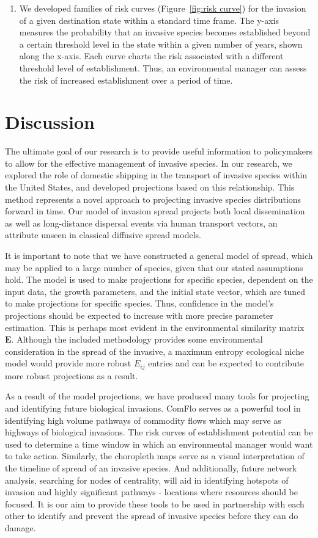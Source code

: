 \documentclass[12pt]{article}
\begin{document}
\begin{enumerate}
\item We developed families of risk curves (Figure~\ref{fig:risk curve}) for the invasion of a given destination state within a standard time frame. The y-axis measures the probability that an invasive species becomes established beyond a certain threshold level in the state within a given number of years, shown along the x-axis. Each curve charts the risk associated with a different threshold level of establishment.  Thus, an environmental manager can assess the risk of increased establishment over a period of time.

\end{enumerate}


\section*{Discussion}

The ultimate goal of our research is to provide useful information to policymakers to allow for the effective management of invasive species. In our research, we explored the role of domestic shipping in the transport of invasive species within the United States, and developed projections based on this relationship. This method represents a novel approach to projecting invasive species distributions forward in time. Our model of invasion spread projects both local dissemination as well as long-distance dispersal events via human transport vectors, an attribute unseen in classical diffusive spread models.

It is important to note that we have constructed a general model of spread, which may be applied to a large number of species, given that our stated assumptions hold. The model is used to make projections for specific species, dependent on the input data, the growth parameters, and the initial state vector, which are tuned to make projections for specific species.  Thus, confidence in the model's projections should be expected to increase with more precise parameter estimation.  This is perhaps most evident in the environmental similarity matrix $\mathbf{E}$. Although the included methodology provides some environmental consideration in the spread of the invasive, a maximum entropy ecological niche model would provide more robust $E_{ij}$ entries and can be expected to contribute more robust projections as a result.

As a result of the model projections, we have produced many tools for projecting and identifying future biological invasions. ComFlo serves as a powerful tool in identifying high volume pathways of commodity flows which may serve as highways of biological invasions. The risk curves of establishment potential can be used to determine a time window in which an environmental manager would want to take action. Similarly, the choropleth maps serve as a visual interpretation of the timeline of spread of an invasive species. And additionally, future network analysis, searching for nodes of centrality, will aid in identifying hotspots of invasion and highly significant pathways - locations where resources should be focused. It is our aim to provide these tools to be used in partnership with each other to identify and prevent the spread of invasive species before they can do damage.
\end{document}

